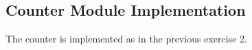 \subsection{Counter Module Implementation}

The counter is implemented as in the previous exercise 2.

\newpage
